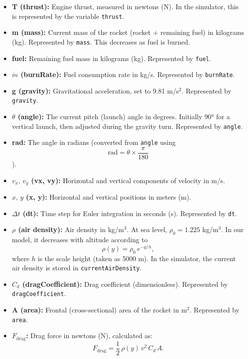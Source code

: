 \documentclass[12pt]{article}
\begin{document}
\begin{itemize}
    \item \textbf{T (thrust):} Engine thrust, measured in newtons (N). In the simulator, this is represented by the variable \texttt{thrust}.
    \item \textbf{m (mass):} Current mass of the rocket (rocket + remaining fuel) in kilograms (kg). Represented by \texttt{mass}. This decreases as fuel is burned.
    \item \textbf{fuel:} Remaining fuel mass in kilograms (kg). Represented by \texttt{fuel}.
    \item \textbf{$\dot{m}$ (burnRate):} Fuel consumption rate in kg/s. Represented by \texttt{burnRate}.
    \item \textbf{g (gravity):} Gravitational acceleration, set to 9.81 m/s\(^2\). Represented by \texttt{gravity}.
    \item \textbf{$\theta$ (angle):} The current pitch (launch) angle in degrees. Initially 90° for a vertical launch, then adjusted during the gravity turn. Represented by \texttt{angle}.
    \item \textbf{rad:} The angle in radians (converted from \texttt{angle} using 
    \[
      \text{rad} = \theta \times \frac{\pi}{180}
    \]
    ).
    \item \textbf{$v_x,\, v_y$ (vx, vy):} Horizontal and vertical components of velocity in m/s.
    \item \textbf{$x,\, y$ (x, y):} Horizontal and vertical positions in meters (m).
    \item \textbf{$\Delta t$ (dt):} Time step for Euler integration in seconds (s). Represented by \texttt{dt}.
    \item \textbf{$\rho$ (air density):} Air density in kg/m\(^3\). At sea level, \(\rho_0 = 1.225\) kg/m\(^3\). In our model, it decreases with altitude according to 
    \[
      \rho(y) = \rho_0 \, e^{-y/h},
    \]
    where \(h\) is the scale height (taken as 5000 m). In the simulator, the current air density is stored in \texttt{currentAirDensity}.
    \item \textbf{$C_d$ (dragCoefficient):} Drag coefficient (dimensionless). Represented by \texttt{dragCoefficient}.
    \item \textbf{A (area):} Frontal (cross-sectional) area of the rocket in m\(^2\). Represented by \texttt{area}.
    \item \textbf{$F_{\text{drag}}$:} Drag force in newtons (N), calculated as:
    \[
      F_{\text{drag}} = \frac{1}{2} \, \rho(y) \, v^2 \, C_d \, A.
\]
\end{itemize}
\end{document}
